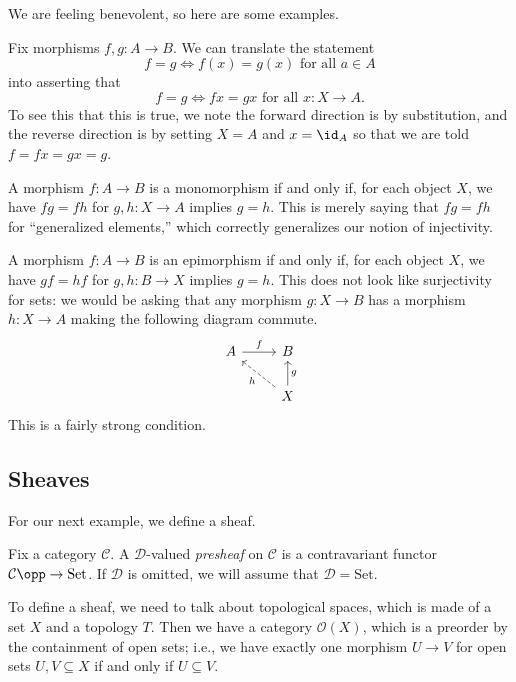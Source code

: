We are feeling benevolent, so here are some examples.
\begin{example}
	Fix morphisms $f,g:A\to B$. We can translate the statement
	\[f=g\iff f(x)=g(x)\text{ for all }a\in A\]
	into asserting that
	\[f=g\iff fx=gx\text{ for all }x:X\to A.\]
	To see this that this is true, we note the forward direction is by substitution, and the reverse direction is by setting $X=A$ and $x=\id_A$ so that we are told $f=fx=gx=g$.
\end{example}
\begin{example}
	A morphism $f:A\to B$ is a monomorphism if and only if, for each object $X$, we have $fg=fh$ for $g,h:X\to A$ implies $g=h$. This is merely saying that $fg=fh$ for ``generalized elements,'' which correctly generalizes our notion of injectivity.
\end{example}
\begin{nex}
	A morphism $f:A\to B$ is an epimorphism if and only if, for each object $X$, we have $gf=hf$ for $g,h:B\to X$ implies $g=h$. This does not look like surjectivity for sets: we would be asking that any morphism $g:X\to B$ has a morphism $h:X\to A$ making the following diagram commute.
	\[\begin{tikzcd}
		A & B \\
		& X
		\arrow["f", from=1-1, to=1-2]
		\arrow["g"', from=2-2, to=1-2]
		\arrow["h", dashed, from=2-2, to=1-1]
	\end{tikzcd}\]
	This is a fairly strong condition.
\end{nex}

\subsection{Sheaves}
For our next example, we define a sheaf.
\begin{definition}[Presheaf]
	Fix a category $\mathcal C$. A $\mathcal D$-valued \textit{presheaf} on $\mathcal C$ is a contravariant functor $\mathcal C\opp\to\mathrm{Set}$. If $\mathcal D$ is omitted, we will assume that $\mathcal D=\mathrm{Set}$.
\end{definition}
To define a sheaf, we need to talk about topological spaces, which is made of a set $X$ and a topology $T$. Then we have a category $\mathcal O(X)$, which is a preorder by the containment of open sets; i.e., we have exactly one morphism $U\to V$ for open sets $U,V\subseteq X$ if and only if $U\subseteq V$.

